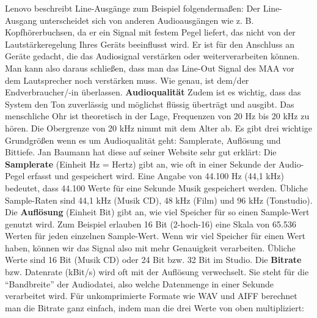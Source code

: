 \documentclass[11pt, twoside]{article}
\begin{document}
Lenovo beschreibt Line-Ausgänge zum Beispiel folgendermaßen: \glqq Der Line-Ausgang unterscheidet sich von anderen Audioausgängen wie z. B. Kopfhörerbuchsen, da er ein Signal mit festem Pegel liefert, das nicht von der Lautstärkeregelung Ihres Geräts beeinflusst wird. Er ist für den Anschluss an Geräte gedacht, die das Audiosignal verstärken oder weiterverarbeiten können.\grqq{} \newline
Man kann also daraus schließen, dass man das Line-Out Signal des MAA vor dem Lautsprecher noch verstärken muss. Wie genau, ist dem/der Endverbraucher/-in überlassen.
\vspace{4mm} \newline
\parencite[vgl.][]{noauthor_urlnl02_nodate}
\vspace{4mm}\newline
\textbf{Audioqualität}\newline
Zudem ist es wichtig, dass das System den Ton zuverlässig und möglichst flüssig überträgt und ausgibt.\newline
\glqq Das menschliche Ohr ist theoretisch in der Lage, Frequenzen von 20 Hz bis 20 kHz zu hören. Die
Obergrenze von 20 kHz nimmt mit dem Alter ab.\grqq{} \newline
Es gibt drei wichtige Grundgrößen wenn es um Audioqualität geht: Samplerate, Auflösung und Bittiefe. Jan Baumann hat diese auf seiner Website sehr gut erklärt:
\vspace{4mm}\newline
\glqq Die \textbf{Samplerate} (Einheit Hz = Hertz) gibt an, wie oft in einer Sekunde der Audio-Pegel erfasst und gespeichert wird. Eine Angabe von 44.100 Hz (44,1 kHz) bedeutet, dass 44.100 Werte für eine Sekunde Musik gespeichert werden. Übliche Sample-Raten sind 44,1 kHz (Musik CD), 48 kHz (Film) und 96 kHz (Tonstudio).\grqq{}
\vspace{4mm}\newline
\glqq Die \textbf{Auflösung} (Einheit Bit) gibt an, wie viel Speicher für so einen Sample-Wert genutzt wird. Zum Beispiel erlauben 16 Bit (2-hoch-16) eine Skala von 65.536 Werten für jeden einzelnen Sample-Wert. Wenn wir viel Speicher für einen Wert haben, können wir das Signal also mit mehr Genauigkeit verarbeiten. Übliche Werte sind 16 Bit (Musik CD) oder 24 Bit bzw. 32 Bit im Studio.\grqq{}
\vspace{4mm}\newline
\glqq Die \textbf{Bitrate} bzw. Datenrate (kBit/s) wird oft mit der Auflösung verwechselt. Sie steht für die “Bandbreite” der Audiodatei, also welche Datenmenge in einer Sekunde verarbeitet wird. Für unkomprimierte Formate wie WAV und AIFF berechnet man die Bitrate ganz einfach, indem man die drei Werte von oben multipliziert:\grqq{}\newline
\end{document}
